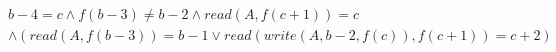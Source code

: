 \begin{align*}
%
& %
b - 4 = c
%
\land
%
f(b - 3)  \neq  b - 2
%
\land
%
\mathit{read}(A,f(c + 1)) = c
~\\~
& %
%
\land
%
(\mathit{read}(A,f(b - 3)) = b - 1 \lor \mathit{read}(\mathit{write}(A,b - 2,f(c)),f(c + 1)) = c + 2)
%
\end{align*}
